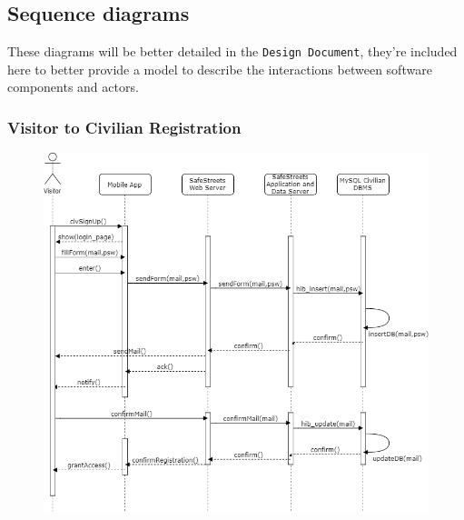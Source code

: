 \documentclass[12pt,a4paper]{article}
\begin{document}
\subsection{Sequence diagrams}
These diagrams will be better detailed in the \texttt{Design Document}, they're included here to better provide a model to describe the interactions between software components and actors.
\subsubsection{Visitor to Civilian Registration}
			\begin{figure}[H]
				\centering
				\includegraphics[width=1\textwidth,height=1\textheight,keepaspectratio]{Images/registration_sequence}
				\label{fig:registration_sequence}
			\end{figure}
\newpage
\end{document}
